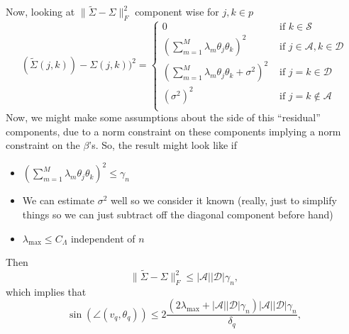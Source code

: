 \documentclass[11pt]{article}
\newcommand{\norm}[1]{\lVert #1 \rVert}
\newcommand{\A}{\mathcal{A}}
\renewcommand{\S}{\mathcal{S}}
\newcommand{\D}{\mathcal{D}}
\begin{document}
Now, looking at $\norm{\tilde{\Sigma} - \Sigma}_{F}^2$ component wise for $j,k \in p$
\[
( \tilde{\Sigma}(j,k)) - \Sigma(j,k))^2 
= 
\begin{cases}
0 & \textrm{ if } k \in \S \\
(\sum_{m = 1}^M \lambda_m \theta_j \theta_k)^2  & \textrm{ if } j \in \A,k \in \D \\
(\sum_{m = 1}^M \lambda_m \theta_j \theta_k  + \sigma^2)^2 & \textrm{ if } j = k \in \D \\
(\sigma^2)^2 & \textrm{ if } j = k \notin \A \\
\end{cases}
\]
Now, we might make some assumptions about the side of this ``residual'' components, due to a norm constraint on these components implying a norm constraint on the $\beta$'s. 
So, the result might look like if
\begin{itemize}
\item $(\sum_{m = 1}^M \lambda_m \theta_j \theta_k)^2 \leq \gamma_n$
\item We can estimate $\sigma^2$ well so we consider it known (really, just to simplify things so we can just subtract off the diagonal component before hand)
\item $\lambda_{\max} \leq C_{\Lambda}$ independent of $n$
\end{itemize}
Then
\[
\norm{\tilde{\Sigma} - \Sigma}_{F}^2 \leq |\A||\D|\gamma_n,
\]
which implies that
\[
\sin(\angle (v_q,\theta_q))
\leq 
2\frac{(2\lambda_{\max} + |\A||\D|\gamma_n)|\A||\D|\gamma_n}{\delta_q},
\]


\end{document}
